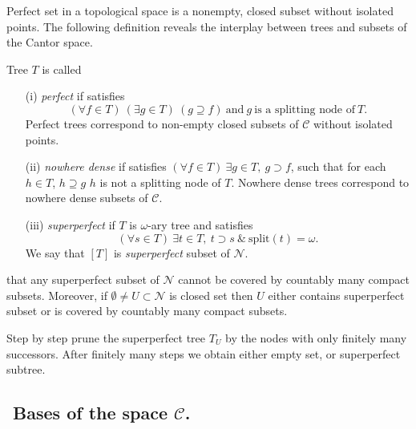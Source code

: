 Perfect set in a topological space is a nonempty, closed subset without isolated
points. The following definition reveals the interplay between trees and
subsets of the Cantor space.

\begin{definition}
Tree $T$ is called
\begin{itemize}
 \item[(i)]%
	\emph{perfect} if satisfies
	$$
	(\forall f \in T) \ (\exists g \in T) \ (g \supseteq f) \
	\mbox{and} \ g \ \mbox{is a splitting node of} \ T.
	$$
	Perfect trees correspond to non-empty closed subsets of
	$\mathcal C$ without isolated points.
	\item[(ii)]%
	\emph{nowhere dense} if satisfies
	$(\forall f \in T)\ \exists g \in T, \ g \supset f$,
	such that for each $h \in T$, $h \supseteq g$ $h$
	is not a splitting node of $T$.
	Nowhere dense trees correspond to nowhere dense
	subsets of $\mathcal C$.
	\item[(iii)] \emph{superperfect} if $T$ is $\omega$-ary
	tree and satisfies
	$$
	(\forall s \in T)\ \exists t \in T, \ t \supset s \ \&
	\ \mbox{split}(t) = \omega.
	$$
	We say that $[T]$ is \emph{superperfect} subset of $\mathcal N$.
\end{itemize}
\end{definition}

 that any superperfect subset of $\mathcal N$ cannot be covered
by countably many compact subsets. Moreover, if $\emptyset \not = U \subset \mathcal N$
is closed set then $U$ either contains superperfect subset or is
covered by countably many compact subsets.

\smallskip
{} Step by step prune the superperfect tree $T_U$
by the nodes with only finitely many successors. After finitely many steps
we obtain either empty set, or superperfect subtree.





\subsection{${}$ \hspace{-1em}Bases of the space $\mathcal C$.}


